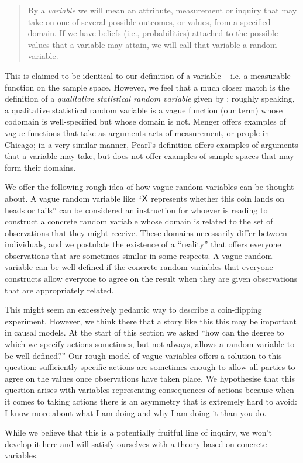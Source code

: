 \begin{quote}
By a \emph{variable} we will mean an attribute, measurement or inquiry that may take on one of several possible outcomes, or values, from a specified domain. If we have beliefs (i.e., probabilities) attached to the possible values that a variable may attain, we will call that variable a random variable.
\end{quote}

This is claimed to be identical to our definition of a variable -- i.e. a measurable function on the sample space. However, we feel that a much closer match is the definition of a \emph{qualitative statistical random variable} given by \citet{menger_random_2003}; roughly speaking, a qualitative statistical random variable is a vague function (our term) whose codomain is well-specified but whose domain is not. Menger offers examples of vague functions that take as arguments acts of measurement, or people in Chicago; in a very similar manner, Pearl's definition offers examples of arguments that a variable may take, but does not offer examples of sample spaces that may form their domains.

We offer the following rough idea of how vague random variables can be thought about. A vague random variable like ``$\mathsf{X}$ represents whether this coin lands on heads or tails'' can be considered an instruction for whoever is reading to construct a concrete random variable whose domain is related to the set of observations that they might receive. These domains necessarily differ between individuals, and we postulate the existence of a ``reality'' that offers everyone observations that are sometimes similar in some respects. A vague random variable can be well-defined if the concrete random variables that everyone constructs allow everyone to agree on the result when they are given observations that are appropriately related.

This might seem an excessively pedantic way to describe a coin-flipping experiment. However, we think there that a story like this this may be important in causal models. At the start of this section we asked ``how can the degree to which we specify actions sometimes, but not always, allows a random variable to be well-defined?'' Our rough model of vague variables offers a solution to this question: sufficiently specific actions are sometimes enough to allow all parties to agree on the values once observations have taken place. We hypothesise that this question arises with variables representing consequences of actions because when it comes to taking actions there is an asymmetry that is extremely hard to avoid: I know more about what I am doing and why I am doing it than you do.

While we believe that this is a potentially fruitful line of inquiry, we won't develop it here and will satisfy ourselves with a theory based on concrete variables.